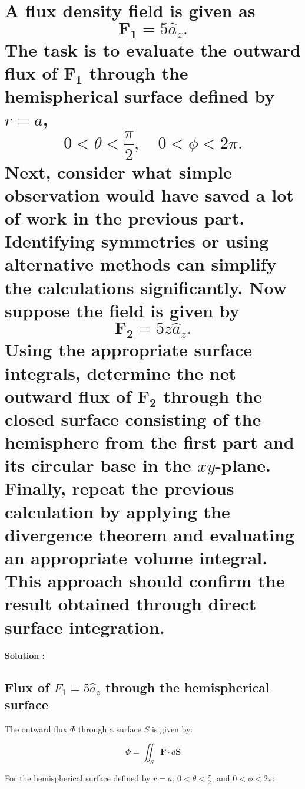 \documentclass[a4paper,12pt]{article}
\begin{document}
\section{A flux density field is given as\[\mathbf{F_1} = 5 \hat{a}_z.\]The task is to evaluate the outward flux of \( \mathbf{F_1} \) through the hemispherical surface defined by \( r = a \),\[0 < \theta < \frac{\pi}{2}, \quad 0 < \phi < 2\pi.\]Next, consider what simple observation would have saved a lot of work in the previous part. Identifying symmetries or using alternative methods can simplify the calculations significantly. Now suppose the field is given by \[\mathbf{F_2} = 5z \hat{a}_z.\]Using the appropriate surface integrals, determine the net outward flux of \( \mathbf{F_2} \) through the closed surface consisting of the hemisphere from the first part and its circular base in the \( xy \)-plane. Finally, repeat the previous calculation by applying the divergence theorem and evaluating an appropriate volume integral. This approach should confirm the result obtained through direct surface integration.}
\textbf{Solution :}
\subsection{Flux of \( F_1 = 5 \hat{a}_z \) through the hemispherical surface}

The outward flux \( \Phi \) through a surface \( S \) is given by:

\[
\Phi = \iint_S \mathbf{F} \cdot d\mathbf{S}
\]

For the hemispherical surface defined by \( r = a \), \( 0 < \theta < \frac{\pi}{2} \), and \( 0 < \phi < 2\pi \):
\end{document}
